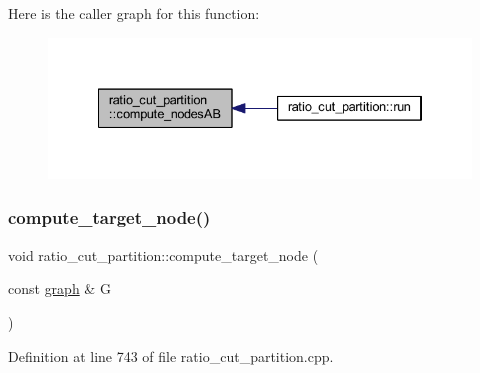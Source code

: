 Here is the caller graph for this function\+:\nopagebreak
\begin{figure}[H]
\begin{center}
\leavevmode
\includegraphics[width=334pt]{classratio__cut__partition_a39341e2459485a3f5367081ff208e769_icgraph}
\end{center}
\end{figure}
\mbox{\label{classratio__cut__partition_ae9a09532c706835e47ee4f02c24c82af}} 
\subsubsection{\texorpdfstring{compute\+\_\+target\+\_\+node()}{compute\_target\_node()}}
{\footnotesize\ttfamily void ratio\+\_\+cut\+\_\+partition\+::compute\+\_\+target\+\_\+node (\begin{DoxyParamCaption}\item[{const \mbox{\hyperlink{classgraph}{graph}} \&}]{G }\end{DoxyParamCaption})\hspace{0.3cm}{\ttfamily [protected]}}



Definition at line 743 of file ratio\+\_\+cut\+\_\+partition.\+cpp.


